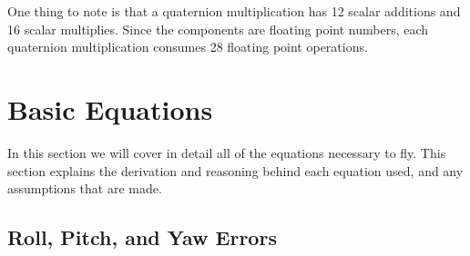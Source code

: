 \documentclass{article}
\numberwithin{equation}{section} %
\begin{document}
One thing to note is that a quaternion multiplication has 12 scalar additions and 16 scalar multiplies. Since the components are floating point numbers, each quaternion multiplication consumes 28 floating point operations. \\

\section{Basic Equations}
In this section we will cover in detail all of the equations necessary to fly. This section explains the derivation and reasoning behind each equation used, and any assumptions that are made.
\subsection{Roll, Pitch, and Yaw Errors} \label{subsec:rollpitchyawerrors}
\end{document}

